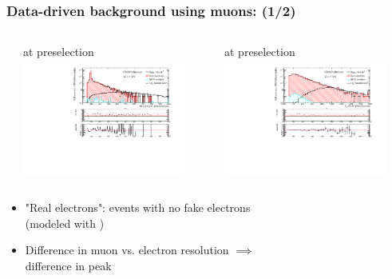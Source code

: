 \documentclass[bigger]{beamer}
\begin{document}
\begin{frame}
\frametitle{Data-driven background using muons: \eejj (1/2)}
\label{sec-1-6-2}
\begin{columns} %
\label{sec-1-6-2-1}
\begin{column}{0.6\textwidth}
\label{sec-1-6-2-1-1}

\centering
\mee at \eejj preselection
\includegraphics[width=0.875\textwidth]{fig/ee/muonbackground/Mee_PAS_eejj.pdf}
\end{column}
\begin{column}{0.6\textwidth}
\label{sec-1-6-2-1-2}

\centering
\ST at \eejj preselection
\includegraphics[width=0.875\textwidth]{fig/ee/muonbackground/sT_PAS_eejj.pdf}
\end{column}
\end{columns}
\label{sec-1-6-2-2}

\footnotesize
\begin{itemize}
\item "Real electrons": \eejj events with no fake electrons \\
(modeled with \mumujj)
\item Difference in muon vs. electron \pt resolution $\implies$ \\
difference in \mee peak
\end{itemize}
\end{frame}
\end{document}
